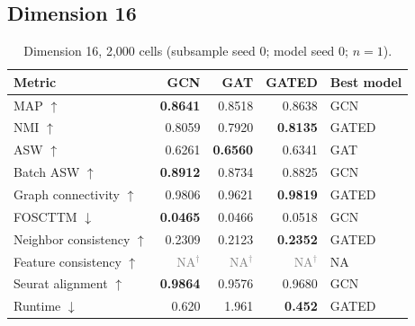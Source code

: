\documentclass[10pt]{article}
\begin{document}
\subsection{Dimension 16}
\begin{table}[H]\centering\small
\caption{Dimension 16, 2,000 cells (subsample seed 0; model seed 0; $n=1$).}
\begin{tabular}{@{}lrrrl@{}}\toprule
Metric & GCN & GAT & GATED & Best model \\\midrule
MAP $\uparrow$ & \textbf{0.8641} & 0.8518 & 0.8638 & GCN \\
NMI $\uparrow$ & 0.8059 & 0.7920 & \textbf{0.8135} & GATED \\
ASW $\uparrow$ & 0.6261 & \textbf{0.6560} & 0.6341 & GAT \\
Batch ASW $\uparrow$ & \textbf{0.8912} & 0.8734 & 0.8825 & GCN \\
Graph connectivity $\uparrow$ & 0.9806 & 0.9621 & \textbf{0.9819} & GATED \\
FOSCTTM $\downarrow$ & \textbf{0.0465} & 0.0466 & 0.0518 & GCN \\
Neighbor consistency $\uparrow$ & 0.2309 & 0.2123 & \textbf{0.2352} & GATED \\
Feature consistency $\uparrow$ & \textcolor{gray}{NA$^{\dagger}$} & \textcolor{gray}{NA$^{\dagger}$} & \textcolor{gray}{NA$^{\dagger}$} & NA \\
Seurat alignment $\uparrow$ & \textbf{0.9864} & 0.9576 & 0.9680 & GCN \\
Runtime $\downarrow$ & 0.620 & 1.961 & \textbf{0.452} & GATED \\
\bottomrule\end{tabular}
\end{table}
\end{document}
